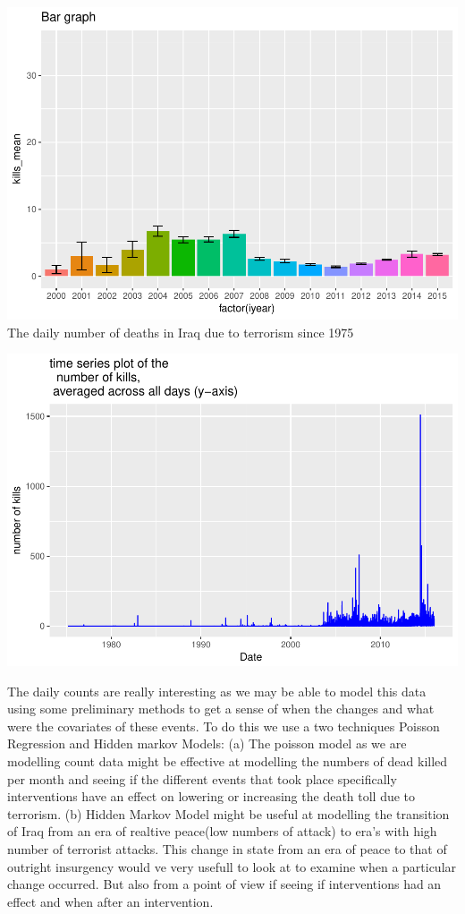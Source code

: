 \documentclass[]{article}
\begin{document}
\includegraphics{Peters_experiment_markdown_files/figure-latex/unnamed-chunk-16-1.pdf}
The daily number of deaths in Iraq due to terrorism since 1975

\includegraphics{Peters_experiment_markdown_files/figure-latex/unnamed-chunk-17-1.pdf}

The daily counts are really interesting as we may be able to model this
data using some preliminary methods to get a sense of when the changes
and what were the covariates of these events. To do this we use a two
techniques Poisson Regression and Hidden markov Models: (a) The poisson
model as we are modelling count data might be effective at modelling the
numbers of dead killed per month and seeing if the different events that
took place specifically interventions have an effect on lowering or
increasing the death toll due to terrorism. (b) Hidden Markov Model
might be useful at modelling the transition of Iraq from an era of
realtive peace(low numbers of attack) to era's with high number of
terrorist attacks. This change in state from an era of peace to that of
outright insurgency would ve very usefull to look at to examine when a
particular change occurred. But also from a point of view if seeing if
interventions had an effect and when after an intervention.
\end{document}
